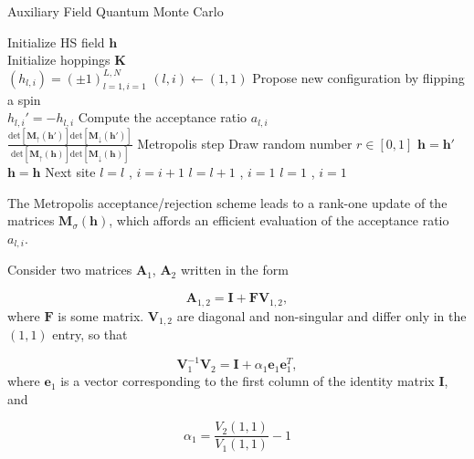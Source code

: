 \documentclass[10pt, twocolumn, twoside]{article}
\begin{document}
\begin{algorithm}
\caption{Auxiliary Field Quantum Monte Carlo}
\label{afqmcSampling}
\begin{multicols}{2}
\begin{algorithmic}[5]
  \STATE Initialize HS field $\bm h$  \\
  \STATE Initialize hoppings $\bm K$  \\
  \STATE  $(h_{l, i}) = (\pm 1)_{l=1, i = 1}^{L, N}$
  \STATE $(l, i) \leftarrow (1, 1)$
  \STATE \footnotesize{Propose new configuration by flipping a spin} \\ \normalsize{$h_{l, i}' = - h_{l, i}$} 
  \STATE \footnotesize{Compute the acceptance ratio $a_{l, i}$} \\
  \normalsize{$\frac{\text{det}[\bm M_\uparrow (\bm h')]\text{det}[\bm M_\downarrow (\bm h')]}{\text{det}[\bm M_\uparrow (\bm h)]\text{det}[\bm M_\downarrow (\bm h)]}$}
  \STATE \normalsize{Metropolis step}
  \STATE \footnotesize{Draw random number $r \in [0,1]$}
  \STATE $\bm h = \bm h'$
  \ELSE
  \STATE $\bm h = \bm h$
  \ENDIF
  \STATE Next site
  \STATE $l = l$ , $i = i +1 $
  \ELSE
  \STATE $l = l+1$ , $i = 1 $
  \ENDIF
  \STATE $l = 1$ , $i=1$
  \ENDIF
  \ENDIF
  \ENDFOR
\end{algorithmic}
\end{multicols}
\end{algorithm}

The Metropolis acceptance/rejection scheme leads to a rank-one update of the matrices $\bm M_\sigma (\bm h)$, which affords an efficient evaluation of the acceptance ratio $a_{l, i}$.

Consider two matrices $\bm A_1$, $\bm A_2$ written in the form

\begin{equation}
\bm A_{1,2} = \bm I + \bm F \bm V_{1,2} ,
\end{equation}
where $\bm F$ is some matrix. $\bm V_{1,2}$ are diagonal and non-singular and differ only in the $(1,1)$ entry, so that

\begin{equation}
\bm V_1^{-1} \bm V_2 = \bm I + \alpha_1 \bm e_1 \bm e_1^T ,
\end{equation}
where $\bm e_1$ is a vector corresponding to the first column of the identity matrix $\bm I$, and

\begin{equation*}
\alpha_1 = \frac{V_2(1,1)}{V_1(1,1)} - 1
\end{equation*}
\end{document}
